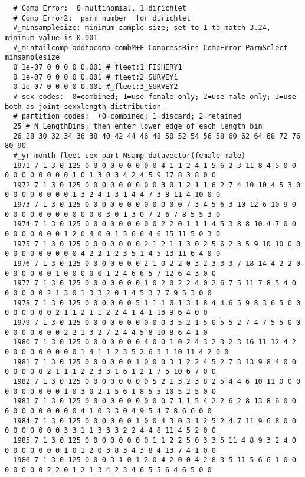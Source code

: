 \begin{landscape}
{\begin{verbatim}
  #_Comp_Error:  0=multinomial, 1=dirichlet
  #_Comp_Error2:  parm number  for dirichlet
  #_minsamplesize: minimum sample size; set to 1 to match 3.24, minimum value is 0.001
  #_mintailcomp addtocomp combM+F CompressBins CompError ParmSelect minsamplesize
  0 1e-07 0 0 0 0 0.001 #_fleet:1_FISHERY1
  0 1e-07 0 0 0 0 0.001 #_fleet:2_SURVEY1
  0 1e-07 0 0 0 0 0.001 #_fleet:3_SURVEY2
  # sex codes:  0=combined; 1=use female only; 2=use male only; 3=use both as joint sexxlength distribution
  # partition codes:  (0=combined; 1=discard; 2=retained
  25 #_N_LengthBins; then enter lower edge of each length bin
  26 28 30 32 34 36 38 40 42 44 46 48 50 52 54 56 58 60 62 64 68 72 76 80 90
  #_yr month fleet sex part Nsamp datavector(female-male)
  1971 7 1 3 0 125 0 0 0 0 0 0 0 0 0 4 1 1 2 4 1 5 6 2 3 11 8 4 5 0 0 0 0 0 0 0 0 0 0 1 0 1 3 0 3 4 2 4 5 9 17 8 3 8 0 0
  1972 7 1 3 0 125 0 0 0 0 0 0 0 0 0 3 0 1 2 1 1 6 2 7 4 10 10 4 5 3 0 0 0 0 0 0 0 0 0 1 3 2 4 1 3 1 4 4 7 3 8 11 4 10 0 0
  1973 7 1 3 0 125 0 0 0 0 0 0 0 0 0 0 0 0 7 3 4 5 6 3 10 12 6 10 9 0 0 0 0 0 0 0 0 0 0 0 0 0 3 0 1 3 0 7 2 6 7 8 5 5 3 0
  1974 7 1 3 0 125 0 0 0 0 0 0 0 0 0 2 2 0 1 1 1 4 5 3 8 8 10 4 7 0 0 0 0 0 0 0 0 0 1 2 0 4 0 0 1 5 6 6 4 6 15 11 5 0 3 0
  1975 7 1 3 0 125 0 0 0 0 0 0 0 2 1 2 1 1 3 0 2 5 6 2 3 5 9 10 10 0 0 0 0 0 0 0 0 0 0 0 4 2 2 1 2 3 5 1 4 5 13 11 6 4 0 0
  1976 7 1 3 0 125 0 0 0 0 0 0 0 2 1 0 2 2 0 3 2 3 3 3 7 18 14 4 2 2 0 0 0 0 0 0 0 1 0 0 0 0 0 1 2 4 6 6 5 7 12 6 4 3 0 0
  1977 7 1 3 0 125 0 0 0 0 0 0 0 1 0 2 0 2 2 4 0 2 6 7 5 11 7 8 5 4 0 0 0 0 0 0 2 1 3 0 1 3 3 2 0 1 4 5 3 7 7 9 5 3 0 0
  1978 7 1 3 0 125 0 0 0 0 0 0 5 1 1 1 0 1 3 1 8 4 4 6 5 9 8 3 6 5 0 0 0 0 0 0 0 0 2 1 1 2 1 1 2 2 4 1 4 1 13 9 6 4 0 0
  1979 7 1 3 0 125 0 0 0 0 0 0 0 0 0 0 3 5 2 1 5 0 5 5 2 7 4 7 5 5 0 0 0 0 0 0 0 0 0 2 2 1 3 2 7 2 4 4 5 8 10 8 6 4 1 0
  1980 7 1 3 0 125 0 0 0 0 0 0 0 4 0 0 1 0 2 4 3 2 3 2 3 16 11 12 4 2 0 0 0 0 0 0 0 0 0 1 4 1 1 2 3 5 2 6 3 1 10 11 4 2 0 0
  1981 7 1 3 0 125 0 0 0 0 0 0 1 0 0 0 3 1 2 2 4 5 2 7 3 13 9 8 4 0 0 0 0 0 0 0 2 1 1 1 2 2 3 3 1 6 1 2 1 7 5 10 6 7 0 0
  1982 7 1 3 0 125 0 0 0 0 0 0 0 0 5 2 1 3 2 3 8 2 5 4 4 6 10 11 0 0 0 0 0 0 0 0 0 0 1 0 3 0 2 1 5 6 1 8 5 5 10 5 2 5 0 0
  1983 7 1 3 0 125 0 0 0 0 0 0 0 0 0 0 7 1 1 5 4 2 2 6 2 8 13 8 6 0 0 0 0 0 0 0 0 0 0 0 4 1 0 3 3 0 4 9 5 4 7 8 6 6 0 0
  1984 7 1 3 0 125 0 0 0 0 0 0 1 0 0 4 3 0 3 1 2 5 2 4 7 11 9 6 8 0 0 0 0 0 0 0 0 0 3 3 1 1 3 3 3 2 2 4 4 8 11 4 5 2 0 0
  1985 7 1 3 0 125 0 0 0 0 0 0 0 0 1 1 2 2 5 0 3 3 5 11 4 8 9 3 2 4 0 0 0 0 0 0 0 0 1 0 1 2 0 3 8 3 4 3 8 4 13 7 4 1 0 0
  1986 7 1 3 0 125 0 0 0 3 1 0 1 2 0 4 2 0 0 4 2 8 3 5 11 5 6 6 1 0 0 0 0 0 0 0 2 2 0 1 2 1 3 4 2 3 4 6 5 5 6 4 6 5 0 0

\end{verbatim}}
\end{landscape}
